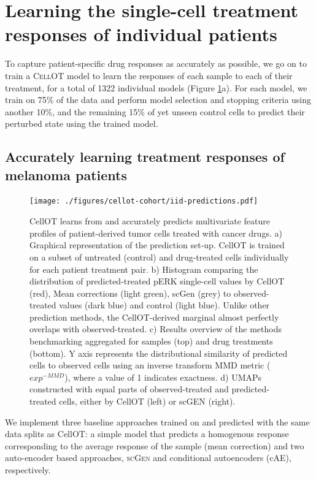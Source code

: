 \section{Learning the single-cell treatment responses of individual patients} \label{sec:cellot-cohort-iid}
To capture patient-specific drug responses as accurately as possible, we go on to train a \textsc{CellOT} model to learn the responses of each sample to each of their treatment, for a total of 1322 individual models (Figure \ref{fig:iid-prediction}a).
For each model, we train on 75\% of the data and perform model selection and stopping criteria using another 10\%,
and the remaining 15\% of yet unseen control cells to predict their perturbed state using the trained model.

\subsection{Accurately learning treatment responses of melanoma patients}

\begin{figure}[hp!]
  \begin{center}
    \texttt{[image: ./figures/cellot-cohort/iid-predictions.pdf]}
  \end{center}
  \caption{CellOT learns from and accurately predicts multivariate feature profiles of patient-derived tumor cells treated with cancer drugs.
  a) Graphical representation of the prediction set-up. CellOT is trained on a subset of untreated (control) and drug-treated cells individually for each patient treatment pair. 
  b) Histogram comparing the distribution of predicted-treated pERK single-cell values by CellOT (red), Mean corrections (light green), scGen (grey) to observed-treated values (dark blue) and control (light blue). Unlike other prediction methods, the CellOT-derived marginal almost perfectly overlaps with observed-treated.
  c) Results overview of the methods benchmarking aggregated for samples (top) and drug treatments (bottom). Y axis represents the distributional similarity of  predicted cells to observed cells using an inverse transform MMD metric ($exp^{-MMD}$), where a value of 1 indicates exactness. 
d) UMAPs constructed with equal parts of observed-treated and predicted-treated cells, either by CellOT (left) or scGEN (right).}
  \label{fig:iid-prediction}
\end{figure}

We implement three baseline approaches trained on and predicted with the same data splits as CellOT: a simple model that predicts a homogenous response corresponding to the average response of the sample (mean correction) and two auto-encoder based approaches, \textsc{scGen} \cite{lotfollahi2019} and conditional autoencoders \cite{lopez2018} (cAE), respectively. 

